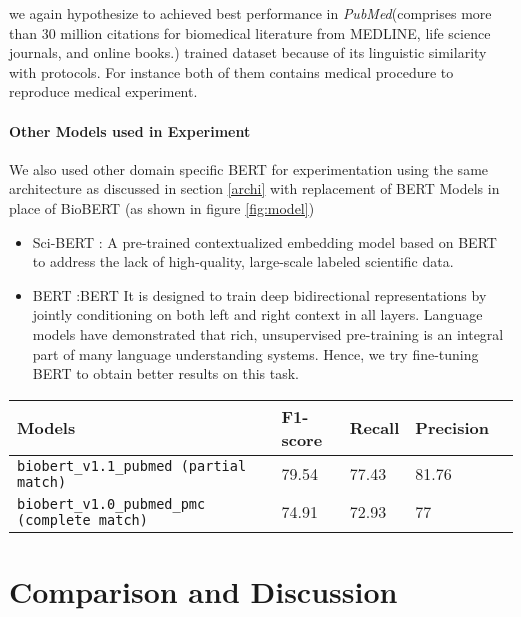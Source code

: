 \documentclass[11pt,a4paper]{article}
\begin{document}
we again hypothesize to achieved best performance in \textit{PubMed}(comprises more than 30 million citations for biomedical literature from MEDLINE, life science journals, and online books.) trained dataset because of its linguistic similarity with protocols. For instance both of them contains medical procedure to reproduce medical experiment.

\paragraph{Other Models used in Experiment}We also used other domain specific BERT for experimentation using the same architecture as discussed in section \ref{archi} with replacement of BERT Models in place of BioBERT (as shown in figure \ref{fig:model})
\begin{itemize}
\item Sci-BERT \cite{Beltagy2019SciBERT} : A pre-trained contextualized embedding model based on BERT to address the lack of high-quality, large-scale labeled scientific data.
\item BERT :BERT \cite{devlin2018pretraining} It is designed to train deep bidirectional representations by jointly conditioning on both left and right context in all layers. Language models have demonstrated that rich, unsupervised pre-training is an integral part of many language understanding systems. Hence, we try fine-tuning BERT to obtain better results on this task.
\end{itemize}




\begin{table*}
\centering
\begin{tabular}{lllll}
\hline
\textbf{Models} & \textbf{F1-score} & \textbf{Recall} & \textbf{Precision}\\
\hline
\verb|biobert_v1.1_pubmed (partial match)| & 79.54 &  77.43 & 81.76 \\ 
\verb|biobert_v1.0_pubmed_pmc (complete match)|  & 74.91 &  72.93 & 77  \\\hline
\end{tabular}

\caption{\label{result-2} 
{Results on the held-out test set provided by shared task organisers on final submission}
}

\end{table*}


\section{Comparison and Discussion} \label{exp}
\end{document}
